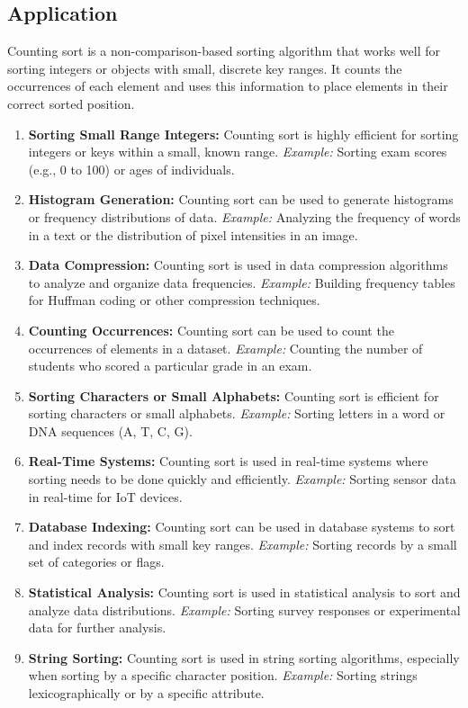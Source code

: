 \subsection{Application}
Counting sort is a non-comparison-based sorting algorithm that works well for sorting integers or objects with small, discrete key ranges. It counts the occurrences of each element and uses this information to place elements in their correct sorted position.
\begin{enumerate}
    \item \textbf{Sorting Small Range Integers:} Counting sort is highly efficient for sorting integers or keys within a small, known range. \textit{Example:} Sorting exam scores (e.g., 0 to 100) or ages of individuals.
    \item \textbf{Histogram Generation:} Counting sort can be used to generate histograms or frequency distributions of data. \textit{Example:} Analyzing the frequency of words in a text or the distribution of pixel intensities in an image.
    \item \textbf{Data Compression:} Counting sort is used in data compression algorithms to analyze and organize data frequencies. \textit{Example:} Building frequency tables for Huffman coding or other compression techniques.
    \item \textbf{Counting Occurrences:} Counting sort can be used to count the occurrences of elements in a dataset. \textit{Example:} Counting the number of students who scored a particular grade in an exam.
    \item \textbf{Sorting Characters or Small Alphabets:} Counting sort is efficient for sorting characters or small alphabets. \textit{Example:} Sorting letters in a word or DNA sequences (A, T, C, G).
    \item \textbf{Real-Time Systems:} Counting sort is used in real-time systems where sorting needs to be done quickly and efficiently. \textit{Example:} Sorting sensor data in real-time for IoT devices.
    \item \textbf{Database Indexing:} Counting sort can be used in database systems to sort and index records with small key ranges. \textit{Example:} Sorting records by a small set of categories or flags.
    \item \textbf{Statistical Analysis:} Counting sort is used in statistical analysis to sort and analyze data distributions. \textit{Example:} Sorting survey responses or experimental data for further analysis.
    \item \textbf{String Sorting:} Counting sort is used in string sorting algorithms, especially when sorting by a specific character position. \textit{Example:} Sorting strings lexicographically or by a specific attribute.
\end{enumerate}

